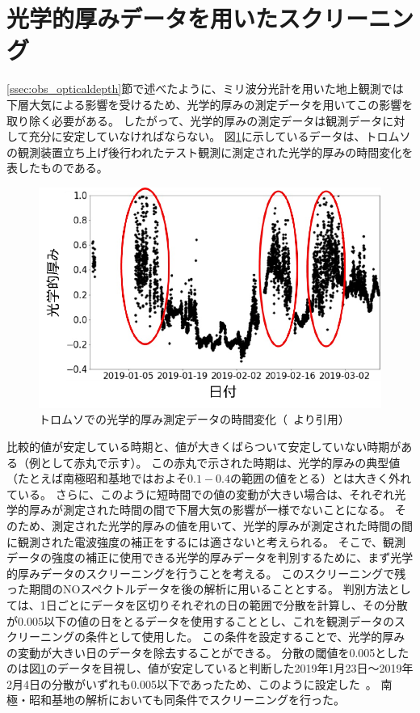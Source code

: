 \section{光学的厚みデータを用いたスクリーニング}
\label{sec:screening_opticaldepth}
\ref{ssec:obs_opticaldepth}節で述べたように、ミリ波分光計を用いた地上観測では下層大気による影響を受けるため、光学的厚みの測定データを用いてこの影響を取り除く必要がある。
したがって、光学的厚みの測定データは観測データに対して充分に安定していなければならない。
図\ref{fig:optical_depth_tromsoe}に示しているデータは、トロムソの観測装置立ち上げ後行われたテスト観測に測定された光学的厚みの時間変化を表したものである。
\begin{figure}[htbp]
    \centering
    \includegraphics[width=\linewidth]{master_thesis_contents/master_thesis_fig/optical_depth_tromsoe.pdf}
    \caption{トロムソでの光学的厚み測定データの時間変化（~\cite{goto2021bachelor}より引用）}
    \label{fig:optical_depth_tromsoe}
\end{figure}
比較的値が安定している時期と、値が大きくばらついて安定していない時期がある（例として赤丸で示す）。
この赤丸で示された時期は、光学的厚みの典型値（たとえば南極昭和基地ではおよそ$0.1-0.4$の範囲の値をとる）とは大きく外れている。
さらに、このように短時間での値の変動が大きい場合は、それぞれ光学的厚みが測定された時間の間で下層大気の影響が一様でないことになる。
そのため、測定された光学的厚みの値を用いて、光学的厚みが測定された時間の間に観測された電波強度の補正をするには適さないと考えられる。
そこで、観測データの強度の補正に使用できる光学的厚みデータを判別するために、まず光学的厚みデータのスクリーニングを行うことを考える。
このスクリーニングで残った期間のNOスペクトルデータを後の解析に用いることとする。
判別方法としては、1日ごとにデータを区切りそれぞれの日の範囲で分散を計算し、その分散が$0.005$以下の値の日をとるデータを使用することとし、これを観測データのスクリーニングの条件として使用した。
この条件を設定することで、光学的厚みの変動が大きい日のデータを除去することができる。
分散の閾値を0.005としたのは図\ref{fig:optical_depth_tromsoe}のデータを目視し、値が安定していると判断した2019年1月23日〜2019年2月4日の分散がいずれも0.005以下であったため、このように設定した~\cite{goto2021bachelor}。
南極・昭和基地の解析においても同条件でスクリーニングを行った。



